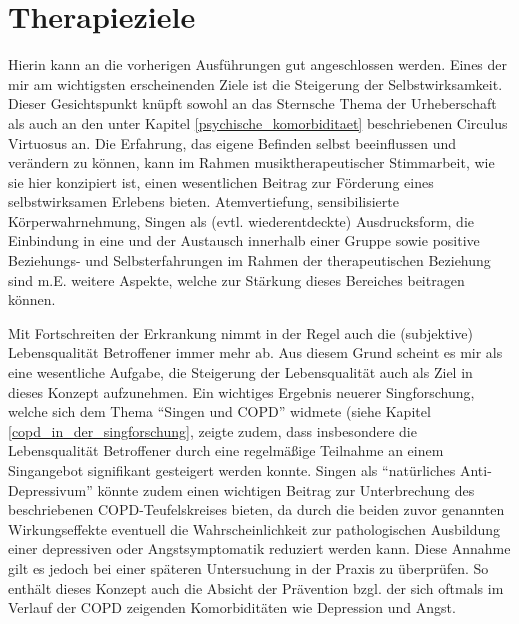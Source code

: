 \section{Therapieziele}
Hierin kann an die vorherigen Ausführungen gut angeschlossen werden. Eines der mir am wichtigsten erscheinenden Ziele ist die Steigerung der Selbstwirksamkeit. Dieser Gesichtspunkt knüpft sowohl an das Sternsche Thema der Urheberschaft als auch an den unter Kapitel \ref{psychische_komorbiditaet} beschriebenen Circulus Virtuosus an. Die Erfahrung, das eigene Befinden selbst beeinflussen und verändern zu können, kann im Rahmen musiktherapeutischer Stimmarbeit, wie sie hier konzipiert ist, einen wesentlichen Beitrag zur Förderung eines selbstwirksamen Erlebens bieten. Atemvertiefung, sensibilisierte Körperwahrnehmung, Singen als (evtl. wiederentdeckte) Ausdrucksform, die Einbindung in eine und der Austausch innerhalb einer Gruppe sowie positive Beziehungs- und Selbsterfahrungen im Rahmen der therapeutischen Beziehung sind m.E. weitere Aspekte, welche zur Stärkung dieses Bereiches beitragen können. %

Mit Fortschreiten der Erkrankung nimmt in der Regel auch die (subjektive) Lebensqualität Betroffener immer mehr ab. Aus diesem Grund scheint es mir als eine wesentliche Aufgabe, die Steigerung der Lebensqualität auch als Ziel in dieses Konzept aufzunehmen. Ein wichtiges Ergebnis neuerer Singforschung, welche sich dem Thema "`Singen und COPD"' widmete (siehe Kapitel  \ref{copd_in_der_singforschung}, zeigte zudem, dass insbesondere die Lebensqualität Betroffener durch eine regelmäßige Teilnahme an einem Singangebot signifikant gesteigert werden konnte. Singen als "`natürliches Anti-Depressivum"' könnte zudem einen wichtigen Beitrag zur Unterbrechung des beschriebenen COPD-Teufelskreises bieten, da durch die beiden zuvor genannten Wirkungseffekte eventuell die Wahrscheinlichkeit zur pathologischen Ausbildung einer depressiven oder Angstsymptomatik reduziert werden kann. Diese Annahme gilt es jedoch bei einer späteren Untersuchung in der Praxis zu überprüfen. So enthält dieses Konzept auch die Absicht der Prävention bzgl. der sich oftmals im Verlauf der COPD zeigenden Komorbiditäten wie Depression und Angst.

